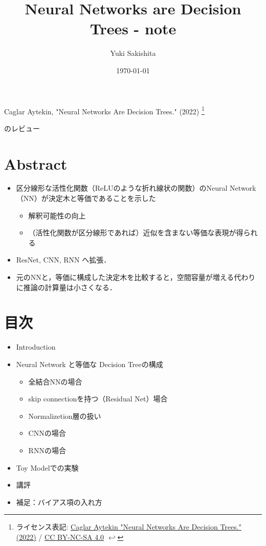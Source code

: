 \documentclass[dvipdfmx,autodetect-engine,12pt,fleqn]{jsarticle}
\title{Neural Networks are Decision Trees - note}
\author{Yuki Sakishita}
\date{\today}
\newcounter{footnote-anchor}
\newcommand{\footnoteanchor}[1]{
    \hypertarget{footnote-anchor\arabic{footnote-anchor}}{}%
    \footnote{#1 \hyperlink{footnote-anchor\arabic{footnote-anchor}}{$\hookleftarrow$}}%
    \addtocounter{footnote-anchor}{1}
}
\begin{document}
\maketitle

Caglar Aytekin, "Neural Networks Are Decision Trees." (2022)\cite{Aytekin2022}\footnoteanchor{ライセンス表記: \href{https://arxiv.org/abs/2210.05189}{Caglar Aytekin "Neural Networks Are Decision Trees." (2022)} /  \href{https://creativecommons.org/licenses/by-nc-sa/4.0/}{CC BY-NC-SA 4.0}}
のレビュー

\section*{Abstract}

\begin{itemize}
    \item 区分線形な活性化関数（ReLUのような折れ線状の関数）のNeural Network（NN）が決定木と等価であることを示した
    \begin{itemize}
        \item 解釈可能性の向上
        \item （活性化関数が区分線形であれば）近似を含まない等価な表現が得られる
    \end{itemize}
    \item ResNet, CNN, RNN へ拡張．
    \item 元のNNと，等価に構成した決定木を比較すると，空間容量が増える代わりに推論の計算量は小さくなる．
\end{itemize}

\section*{目次}

\begin{itemize}
    \item Introduction
    \item Neural Network と等価な Decision Treeの構成
    \begin{itemize}
        \item 全結合NNの場合
        \item skip connectionを持つ（Residual Net）場合
        \item Normalizetion層の扱い
        \item CNNの場合
        \item RNNの場合
    \end{itemize}
    \item Toy Modelでの実験
    \item 講評
    \item 補足：バイアス項の入れ方
\end{itemize}
\end{document}

